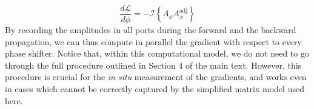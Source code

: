 %
\begin{equation}
\frac{d\mathcal{L}}{d\phi} = -
\mathcal{I}\left\{ A_\phi A^{\mathrm{adj}}_\phi \right\}
\end{equation}
%
By recording the amplitudes in all ports during the forward and the backward propagation, we can thus compute in parallel the gradient with respect to every phase shifter. Notice that, within this computational model, we do not need to go through the full procedure outlined in Section 4 of the main text. However, this procedure is crucial for the \textit{in situ} measurement of the gradients, and works even in cases which cannot be correctly captured by the simplified matrix model used here. 

